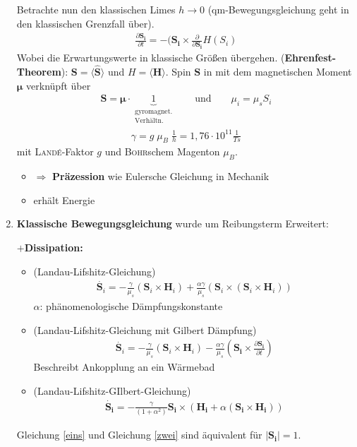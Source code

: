 \documentclass[12pt]{article}
\begin{document}
\begin{enumerate}
  Betrachte nun den klassischen Limes $h \to 0$ (qm-Bewegungsgleichung geht in den klassischen Grenzfall über).
  \begin{align*}
 \frac{\partial \mathbf{S_i}}{\partial t}= - ( \mathbf{S_i} \times \frac{\partial}{\partial \mathbf{S_i}} H(S_i)
  \end{align*}
  Wobei die Erwartungswerte in klassische Größen übergehen. (\textbf{Ehrenfest-Theorem}): $\mathbf{S} = \langle \hat{\mathbf{S}} \rangle$ und $H= \langle \hat{\mathbf{H}} \rangle$. Spin $\mathbf{S}$ in mit dem magnetischen Moment $\mathbf{\mu}$ verknüpft über 
  \begin{align*}
  \mathbf{S}= \mathbf{\mu} \cdot \underbrace{1}_{\substack{ \text{gyromagnet.} \\ \text{Verhältn.}}} \qquad  \text{und}\qquad \mu_i = \mu_s S_i
  \end{align*}
  \begin{align*}
  \gamma = g \; \mu_B \; \frac{1}{h} = 1,76 \cdot 10^{11} \frac{1}{Ts}
  \end{align*}
  mit \textsc{Landé}-Faktor $g$ und \textsc{Bohr}schem Magenton $\mu_B$.
  \begin{itemize}
  \item $\Rightarrow$ \textbf{Präzession} wie Eulersche Gleichung in Mechanik
  \item erhält Energie
  \end{itemize}
  \item \textbf{Klassische Bewegungsgleichung} wurde um Reibungsterm Erweitert:
  
  \textbf{$+$Dissipation:}
  \begin{itemize}
 \item (Landau-Lifshitz-Gleichung)
  \begin{align}
  \dot{\mathbf{S}_i}= -\frac{\gamma}{\mu_s} (\mathbf{S}_i \times \mathbf{H}_i ) + \frac{\alpha \gamma}{\mu_s} (\mathbf{S}_i \times ( \mathbf{S}_i \times \mathbf{H}_i))
  \end{align}
  $\alpha$: phänomenologische Dämpfungskonstante \\
  
  \item (Landau-Lifshitz-Gleichung mit Gilbert Dämpfung) \label{eins}
  \begin{align*}
   \dot{\mathbf{S}_i}= -\frac{\gamma}{\mu_s} (\mathbf{S}_i \times \mathbf{H}_i ) - \frac{\alpha \gamma}{\mu_s} ( \mathbf{S_i} \times \frac{\partial \mathbf{S_i}}{\partial t} )
   \end{align*}
   Beschreibt Ankopplung an ein Wärmebad
   \item (Landau-Lifshitz-GIlbert-Gleichung) \label{zwei}
   \begin{align*}
  \dot{ \mathbf{S_i}} = - \frac{\gamma}{(1+\alpha^2)} \mathbf{S_i} \times \left( \mathbf{H_i} + \alpha (\mathbf{S_i} \times \mathbf{H_i})\right)
   \end{align*}
\end{itemize}
Gleichung \ref{eins} und Gleichung \ref{zwei} sind äquivalent für $\vert \mathbf{S_i} \vert = 1 $.
   

\end{enumerate}
\end{document}
